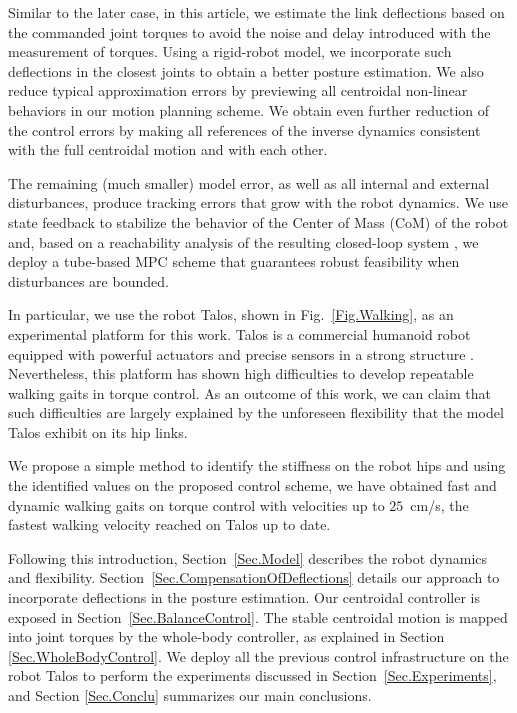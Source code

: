 \documentclass[letterpaper, 10 pt, conference]{ieeeconf}  %
\begin{document}
Similar to the later case, in this article, we estimate the link deflections based on the commanded joint torques to avoid the noise and delay introduced with the measurement of torques. Using a rigid-robot model, we incorporate such deflections in the closest joints to obtain a better posture estimation. We also reduce typical approximation errors by previewing all centroidal non-linear behaviors in our motion planning scheme. We obtain even further reduction of the control errors by making all references of the inverse dynamics consistent with the full centroidal motion and with each other.

The remaining (much smaller) model error, as well as all internal and external disturbances, produce tracking errors that grow with the robot dynamics. We use state feedback to stabilize the behavior of the Center of Mass (CoM) of the robot and, based on a reachability analysis of the resulting closed-loop system \cite{Villa2019Sensitivity2Uncertainties}, we deploy a tube-based MPC \cite{Tube} scheme that guarantees robust feasibility when disturbances are bounded.

In particular, we use the robot Talos, shown in Fig.~\ref{Fig.Walking}, as an experimental platform for this work. Talos is a commercial humanoid robot equipped with powerful actuators and precise sensors in a strong structure \cite{Stasse2017Talos}. Nevertheless, this platform has shown high difficulties to develop repeatable walking gaits in torque control. As an outcome of this work, we can claim that such difficulties are largely explained by the unforeseen flexibility that the model Talos exhibit on its hip links. 

We propose a simple method to identify the stiffness on the robot hips and using the identified values on the proposed control scheme, we have obtained fast and dynamic walking gaits on torque control with velocities up to $25$~cm/s, the fastest walking velocity reached on Talos up to date.



Following this introduction, Section~\ref{Sec.Model} describes the robot dynamics and flexibility. Section~\ref{Sec.CompensationOfDeflections} details our approach to incorporate deflections in the posture estimation. Our centroidal controller is exposed in Section~\ref{Sec.BalanceControl}. The stable centroidal motion is mapped into joint torques by the whole-body controller, as explained in Section \ref{Sec.WholeBodyControl}. We deploy all the previous control infrastructure on the robot Talos to perform the experiments discussed in Section~\ref{Sec.Experiments}, and Section \ref{Sec.Conclu} summarizes our main conclusions. 
\end{document}
